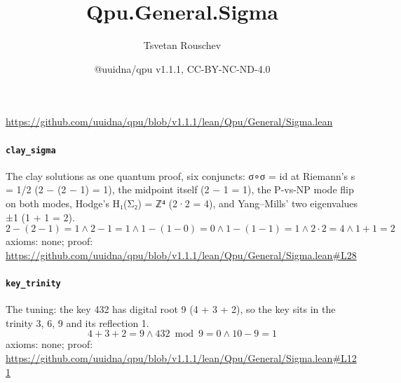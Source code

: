 \documentclass[11pt]{article}
\title{Qpu.General.Sigma}
\author{Tsvetan Rouschev}
\date{@uuidna/qpu v1.1.1, CC-BY-NC-ND-4.0}
\begin{document}
\maketitle
\noindent\url{https://github.com/uuidna/qpu/blob/v1.1.1/lean/Qpu/General/Sigma.lean}

\paragraph{\texttt{clay\_sigma}}
The clay solutions as one quantum proof, six conjuncts: σ∘σ = id at Riemann's s = 1/2 (2 − (2 − 1) = 1), the midpoint itself (2 − 1 = 1), the P-vs-NP mode flip on both modes, Hodge's H₁(Σ₂) = ℤ⁴ (2·2 = 4), and Yang–Mills' two eigenvalues ±1 (1 + 1 = 2).
\[ 2 - (2 - 1) = 1 \land 2 - 1 = 1 \land 1 - (1 - 0) = 0 \land 1 - (1 - 1) = 1 \land 2 \cdot 2 = 4 \land 1 + 1 = 2 \]
\noindent axioms: none; proof: \url{https://github.com/uuidna/qpu/blob/v1.1.1/lean/Qpu/General/Sigma.lean\#L28}

\paragraph{\texttt{key\_trinity}}
The tuning: the key 432 has digital root 9 (4 + 3 + 2), so the key sits in the trinity 3, 6, 9 and its reflection 1.
\[ 4 + 3 + 2 = 9 \land 432 \bmod 9 = 0 \land 10 - 9 = 1 \]
\noindent axioms: none; proof: \url{https://github.com/uuidna/qpu/blob/v1.1.1/lean/Qpu/General/Sigma.lean\#L121}
\end{document}
